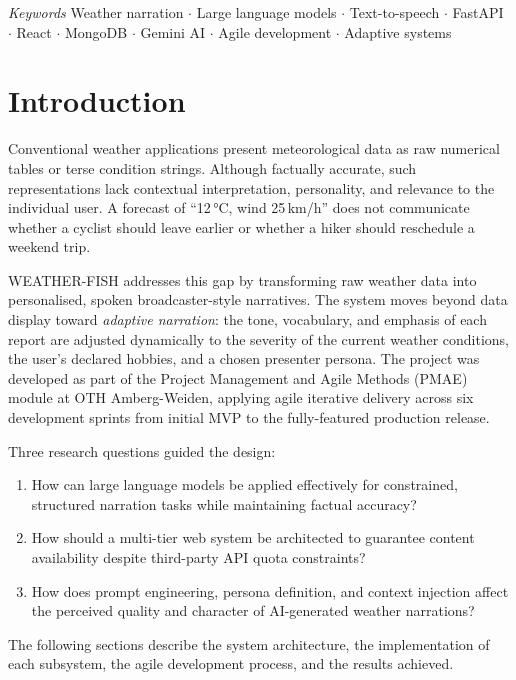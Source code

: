 \documentclass[11pt, a4paper]{article}
\begin{document}
\vspace{4pt}
\noindent\textit{Keywords}\quad
Weather narration $\cdot$ Large language models $\cdot$ Text-to-speech $\cdot$ FastAPI $\cdot$
React $\cdot$ MongoDB $\cdot$ Gemini AI $\cdot$ Agile development $\cdot$ Adaptive systems

\bigskip

\section{Introduction}

Conventional weather applications present meteorological data as raw numerical tables or terse condition
strings. Although factually accurate, such representations lack contextual interpretation, personality,
and relevance to the individual user. A forecast of ``12\,°C, wind 25\,km/h'' does not communicate
whether a cyclist should leave earlier or whether a hiker should reschedule a weekend trip.

WEATHER-FISH addresses this gap by transforming raw weather data into personalised, spoken
broadcaster-style narratives. The system moves beyond data display toward \textit{adaptive narration}:
the tone, vocabulary, and emphasis of each report are adjusted dynamically to the severity of the
current weather conditions, the user's declared hobbies, and a chosen presenter persona.
The project was developed as part of the Project Management and Agile Methods (PMAE) module
at OTH Amberg-Weiden, applying agile iterative delivery across six development sprints from
initial MVP to the fully-featured production release.

Three research questions guided the design:
\begin{enumerate}[noitemsep]
  \item How can large language models be applied effectively for constrained, structured
        narration tasks while maintaining factual accuracy?
  \item How should a multi-tier web system be architected to guarantee content availability
        despite third-party API quota constraints?
  \item How does prompt engineering, persona definition, and context injection affect the
        perceived quality and character of AI-generated weather narrations?
\end{enumerate}

The following sections describe the system architecture, the implementation of each subsystem,
the agile development process, and the results achieved.
\end{document}
